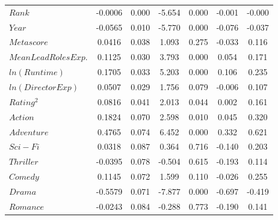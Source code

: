 \begin{table}[H]
\begin{center}
\begin{tabular}{lcccccc}
                \textbf{$Rank$}                 &      -0.0006  &        0.000     &    -5.654  &         0.000        &       -0.001    &       -0.000     \\
                \textbf{$Year$}                 &      -0.0565  &        0.010     &    -5.770  &         0.000        &       -0.076    &       -0.037     \\
                \textbf{$Metascore$}            &       0.0416  &        0.038     &     1.093  &         0.275        &       -0.033    &        0.116     \\
                \textbf{$Mean Lead Roles Exp.$} &       0.1125  &        0.030     &     3.793  &         0.000        &        0.054    &        0.171     \\
                \textbf{$ln(Runtime)$}          &       0.1705  &        0.033     &     5.203  &         0.000        &        0.106    &        0.235     \\
                \textbf{$ln(Director Exp)$}     &       0.0507  &        0.029     &     1.756  &         0.079        &       -0.006    &        0.107     \\
                \textbf{$Rating^2$}             &       0.0816  &        0.041     &     2.013  &         0.044        &        0.002    &        0.161     \\
                \textbf{$Action$}               &       0.1824  &        0.070     &     2.598  &         0.010        &        0.045    &        0.320     \\
                \textbf{$Adventure$}            &       0.4765  &        0.074     &     6.452  &         0.000        &        0.332    &        0.621     \\
                \textbf{$Sci-Fi$}               &       0.0318  &        0.087     &     0.364  &         0.716        &       -0.140    &        0.203     \\
                \textbf{$Thriller$}             &      -0.0395  &        0.078     &    -0.504  &         0.615        &       -0.193    &        0.114     \\
                \textbf{$Comedy$}               &       0.1145  &        0.072     &     1.599  &         0.110        &       -0.026    &        0.255     \\
                \textbf{$Drama$}                &      -0.5579  &        0.071     &    -7.877  &         0.000        &       -0.697    &       -0.419     \\
                \textbf{$Romance$}              &      -0.0243  &        0.084     &    -0.288  &         0.773        &       -0.190    &        0.141     \\

\end{tabular}
\end{center}
\end{table}
